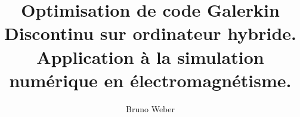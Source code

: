 \documentclass[a4paper,12pt,twoside,openright]{report}
\title{\huge{\textbf{Optimisation de code Galerkin Discontinu sur ordinateur hybride. Application à la simulation numérique en électromagnétisme.}}}
\author{Bruno Weber}
\begin{document}
\begin{titlepage}
	
\end{titlepage}
\thispagestyle{empty}

\cleardoublepage
{}


\cleardoublepage
\tableofcontents

\cleardoublepage
{}


\cleardoublepage


\cleardoublepage


\cleardoublepage


\cleardoublepage


\cleardoublepage


\cleardoublepage


\cleardoublepage


\cleardoublepage


\cleardoublepage
\appendix


\cleardoublepage


\cleardoublepage


\cleardoublepage



\cleardoublepage
\thispagestyle{empty}
\hbox{}\newpage%

\end{document}

